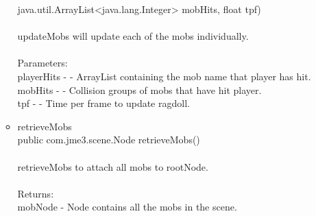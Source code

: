 \documentclass[letterpaper]{article}
\begin{document}
\begin{itemize}
\begin{itemize}
													java.util.ArrayList<java.lang.Integer> mobHits,
													float tpf) \\ \\
													updateMobs will update each of the mobs individually. \\ \\
													Parameters: \\
													playerHits - - ArrayList containing the mob name that player has hit. \\
													mobHits - - Collision groups of mobs that have hit player. \\
													tpf - - Time per frame to update ragdoll. \\
											\item	retrieveMobs \\
													public com.jme3.scene.Node retrieveMobs() \\ \\
													retrieveMobs to attach all mobs to rootNode. \\ \\
													Returns: \\
													mobNode - Node contains all the mobs in the scene.
										\end{itemize}
							\end{itemize}
						
						\vspace{0.2in}
\end{document}
